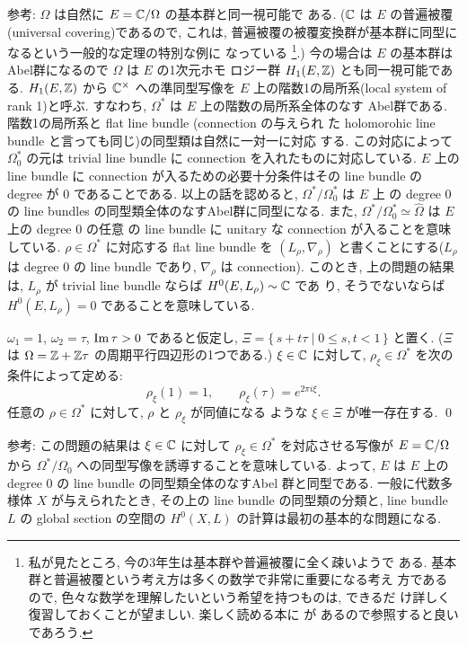 \documentclass[12pt,twoside]{jarticle}
\def\Omegahat{\widehat\Omega}
\def\Z{{\Bbb Z}} %
\def\C{{\Bbb C}} %
\def\Impart{\mathop{\text{\rm Im}}\nolimits} %
\begin{document}
\noindent 参考: $\Omega$ は自然に $E=\C/\Omega$ の基本群と同一視可能で
ある. ($\C$ は $E$ の普遍被覆(universal covering)であるので, これは, 
普遍被覆の被覆変換群が基本群に同型になるという一般的な定理の特別な例に
なっている%
\footnote{私が見たところ, 今の3年生は基本群や普遍被覆に全く疎いようで
  ある. 基本群と普遍被覆という考え方は多くの数学で非常に重要になる考え
  方であるので, 色々な数学を理解したいという希望を持つものは, できるだ
  け詳しく復習しておくことが望ましい. 楽しく読める本に \cite{Kuga1} が
  あるので参照すると良いであろう.}.) %
今の場合は $E$ の基本群はAbel群になるので $\Omega$ は $E$ の1次元ホモ
ロジー群 $H_1(E,\Z)$ とも同一視可能である. $H_1(E,\Z)$ から %
$\C^{\times}$ への準同型写像を $E$ 上の階数1の局所系(local system of
rank 1)と呼ぶ. すなわち, $\Omega^*$ は $E$ 上の階数の局所系全体のなす
Abel群である. 階数1の局所系と flat line bundle (connection の与えられ
た holomorohic line bundle と言っても同じ)の同型類は自然に一対一に対応
する. この対応によって $\Omega^*_0$ の元は trivial line bundle に 
connection を入れたものに対応している. $E$ 上の line bundle に 
connection が入るための必要十分条件はその line bundle の degree が 0 
であることである. 以上の話を認めると, $\Omega^*/\Omega^*_0$ は $E$ 上
の degree 0 の line bundles の同型類全体のなすAbel群に同型になる. %
また, $\Omega^*/\Omega^*_0\simeq\Omegahat$ は $E$ 上の degree 0 の任意
の line bundle に unitary な connection が入ることを意味している. %
$\rho\in\Omega^*$ に対応する flat line bundle を %
$(L_\rho,\nabla_\rho)$ と書くことにする($L_\rho$ は degree 0 の line
bundle であり, $\nabla_\rho$ は connection). このとき, 上の問題の結果
は, $L_\rho$ が trivial line bundle ならば $H^0(E,L_\rho)\sim\C$ であ
り, そうでないならば $H^0(E,L_\rho)=0$ であることを意味している.

\begin{question}
  $\omega_1=1$, $\omega_2=\tau$, $\Impart\tau>0$ であると仮定し, %
  \(
    \Xi = \{\, s + t\tau \mid 0\le s,t<1 \,\}
  \)
  と置く. ($\Xi$ は $\Omega=\Z+\Z\tau$ の周期平行四辺形の1つである.) 
  $\xi\in\C$ に対して, $\rho_\xi\in\Omega^*$ を次の条件によって定める:
  \[
    \rho_\xi(1)=1,
    \qquad
    \rho_\xi(\tau)=e^{2\pi i\xi}.
  \] %
  任意の $\rho\in\Omega^*$ に対して, $\rho$ と $\rho_\xi$ が同値になる
  ような $\xi\in\Xi$ が唯一存在する. \qed
\end{question}

\noindent 参考: この問題の結果は $\xi\in\C$ に対して %
$\rho_\xi\in\Omega^*$ を対応させる写像が $E=\C/\Omega$ から %
$\Omega^*/\Omega_0$ への同型写像を誘導することを意味している. %
よって, $E$ は $E$ 上の degree 0 の line bundle の同型類全体のなすAbel
群と同型である. 一般に代数多様体 $X$ が与えられたとき, その上の line
bundle の同型類の分類と, line bundle $L$ の global section の空間の %
$H^0(X,L)$ の計算は最初の基本的な問題になる. 
\end{document}
